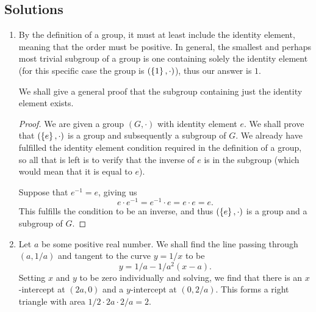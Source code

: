 \subsection{Solutions}
\begin{enumerate}
    \item By the definition of a group, it must at least include the identity
        element, meaning that the order must be positive. In general, the
        smallest and perhaps most trivial subgroup of a group is one containing
        solely the identity element (for this specific case the group is \(
        \left( \left\{ 1 \right\}, \cdot \right) \)), thus our answer is \( \boxed{1} \).

        We shall give a general proof that the subgroup containing just the
        identity element exists.
        \begin{proof}
            We are given a group \( \left( G, \cdot \right) \) with identity
            element \( e \). We shall prove that \( \left( \left\{ e \right\}, \cdot
            \right) \) is a group and subsequently a subgroup of \( G \). We
            already have fulfilled the identity element condition required in
            the definition of a group, so all that is left is to verify that
            the inverse of \( e \) is in the subgroup (which would mean that it is equal to \( e \)).

            Suppose that \( e^{-1} = e \), giving us
            \[
                e \cdot e^{-1} = e^{-1} \cdot e = e \cdot e = e
            .\]
            This fulfills the condition to be an inverse, and thus \( \left(
            \left\{ e \right\}, \cdot \right) \) is a group and a subgroup of \( G \).
        \end{proof}

    \item Let \( a \) be some positive real number. We shall find the line
        passing through \( \left( a, 1 / a \right) \) and tangent to the curve
        \( y = 1 / x \) to be
        \[
            y = 1 / a - 1 / a^2 \left( x - a \right)
        .\]
        Setting \( x \) and \( y \) to be zero individually and solving, we
        find that there is an \( x \)-intercept at \( \left( 2a, 0 \right) \)
        and a \( y \)-intercept at \( \left( 0, 2/a \right) \). This forms a right triangle
        with area \( 1 / 2 \cdot 2a \cdot 2 / a = \boxed{2} \).

    \begin{figure}[h]
        \centering
\end{figure}
\end{enumerate}
